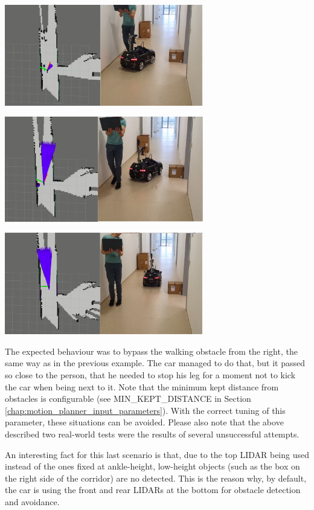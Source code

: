 \begin{center}
    \vspace{0.5cm}
    \includegraphics[width=0.65\textwidth]{figures/raw/local_planner_real_test_joined_straight_traj_1_dynamic_obj_4.png}
    
    \vspace{0.5cm}
    \includegraphics[width=0.65\textwidth]{figures/raw/local_planner_real_test_joined_straight_traj_1_dynamic_obj_5.png}
    
    \vspace{0.5cm}
    \includegraphics[width=0.65\textwidth]{figures/raw/local_planner_real_test_joined_straight_traj_1_dynamic_obj_6.png}
    
    \label{local_planner_real_test_joined_straight_traj_1_dynamic_obj}
\end{center}

The expected behaviour was to bypass the walking obstacle from the right, the same way as in the previous example. The car managed to do that, but it passed so close to the person, that he needed to stop his leg for a moment not to kick the car when being next to it. Note that the minimum kept distance from obstacles is configurable (see MIN\_KEPT\_DISTANCE in Section \ref{chap:motion_planner_input_parameters}). With the correct tuning of this parameter, these situations can be avoided. Please also note that the above described two real-world tests were the results of several unsuccessful attempts.

An interesting fact for this last scenario is that, due to the top LIDAR being used instead of the ones fixed at ankle-height, low-height objects (such as the box on the right side of the corridor) are no detected. This is the reason why, by default, the car is using the front and rear LIDARs at the bottom for obstacle detection and avoidance.